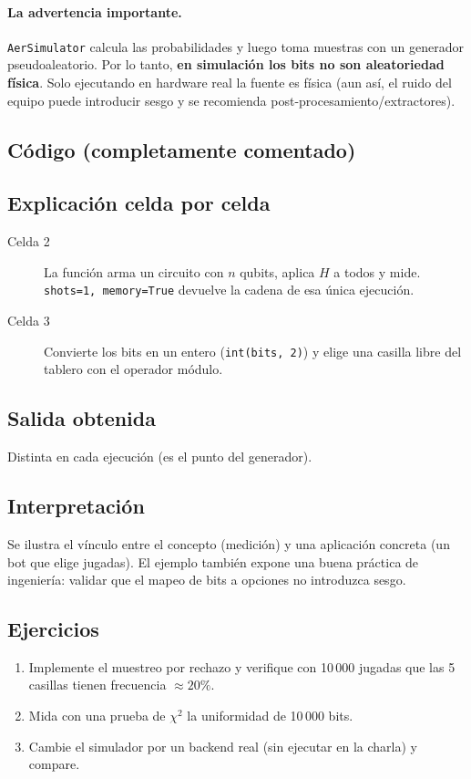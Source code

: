 \paragraph{La advertencia importante.} \texttt{AerSimulator} calcula las
probabilidades y luego toma muestras con un generador pseudoaleatorio. Por lo
tanto, \textbf{en simulación los bits no son aleatoriedad física}. Solo
ejecutando en hardware real la fuente es física (aun así, el ruido del equipo
puede introducir sesgo y se recomienda post-procesamiento/extractores).

\subsection{Código (completamente comentado)}


\subsection{Explicación celda por celda}
\begin{description}
  \item[Celda 2] La función arma un circuito con $n$ qubits, aplica $H$ a todos
    y mide. \texttt{shots=1, memory=True} devuelve la cadena de esa única
    ejecución.
  \item[Celda 3] Convierte los bits en un entero (\texttt{int(bits, 2)}) y
    elige una casilla libre del tablero con el operador módulo.
\end{description}

\subsection{Salida obtenida}

Distinta en cada ejecución (es el punto del generador).

\subsection{Interpretación}
Se ilustra el vínculo entre el concepto (medición) y una aplicación
concreta (un bot que elige jugadas). El ejemplo también expone una buena
práctica de ingeniería: validar que el mapeo de bits a opciones no introduzca
sesgo.

\subsection{Ejercicios}
\begin{enumerate}
  \item Implemente el muestreo por rechazo y verifique con 10\,000 jugadas que
    las 5 casillas tienen frecuencia $\approx20\%$.
  \item Mida con una prueba de $\chi^2$ la uniformidad de 10\,000 bits.
  \item Cambie el simulador por un backend real (sin ejecutar en la charla) y
    compare.
\end{enumerate}


